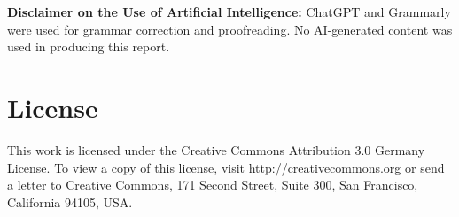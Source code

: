 \documentclass[ITR, MA, english, final]{LSR_thesis}
\begin{document}
\newpage
\textbf{Disclaimer on the Use of Artificial Intelligence:} ChatGPT and Grammarly
were used for grammar correction and proofreading. No AI-generated content was
used in producing this report.
\phantom{u}
\phantom{1}\vspace{6cm}
\begin{center}
\end{center}

\pagestyle{fancy}

\tableofcontents 

\ifLSRITRtutorial
	
\fi

%









\appendix



\cleardoublepage
{}
{} 
\listoffigures 	

\cleardoublepage
{}
{} 
\listoftables

\ifdefined\AddMyGloss
    \AddMyGloss 
\fi

\cleardoublepage
{}
{}



\cleardoublepage
\chapter*{License}
This work is licensed under the Creative Commons Attribution 3.0 Germany License. To view a copy of this license, visit \href{http://creativecommons.org/licenses/by/3.0/de/}{http://creativecommons.org} or send a letter to Creative Commons, 171 Second Street, Suite 300, San Francisco, California 94105, USA.

\listoftodos
\end{document}
